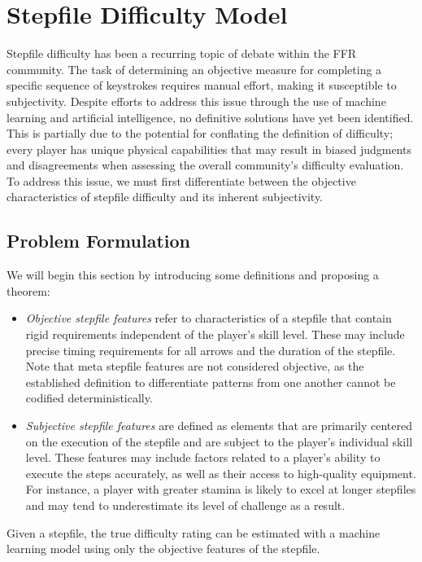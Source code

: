 \section{Stepfile Difficulty Model}
\label{sec:stepfile_difficulty}

Stepfile difficulty has been a recurring topic of debate within the FFR community. The task of determining an objective measure for completing a specific sequence of keystrokes requires manual effort, making it susceptible to subjectivity. Despite efforts to address this issue through the use of machine learning and artificial intelligence, no definitive solutions have yet been identified. This is partially due to the potential for conflating the definition of difficulty; every player has unique physical capabilities that may result in biased judgments and disagreements when assessing the overall community's difficulty evaluation. To address this issue, we must first differentiate between the objective characteristics of stepfile difficulty and its inherent subjectivity.

\subsection{Problem Formulation}

We will begin this section by introducing some definitions and proposing a theorem:

\begin{itemize}
    \item \textit{Objective stepfile features} refer to characteristics of a stepfile that contain rigid requirements independent of the player's skill level. These may include precise timing requirements for all arrows and the duration of the stepfile. Note that meta stepfile features are not considered objective, as the established definition to differentiate patterns from one another cannot be codified deterministically. 
    \item \textit{Subjective stepfile features} are defined as elements that are primarily centered on the execution of the stepfile and are subject to the player's individual skill level. These features may include factors related to a player's ability to execute the steps accurately, as well as their access to high-quality equipment. For instance, a player with greater stamina is likely to excel at longer stepfiles and may tend to underestimate its level of challenge as a result. 
\end{itemize}

\begin{theorem}
Given a stepfile, the true difficulty rating can be estimated with a machine learning model using only the objective features of the stepfile.
\end{theorem}

